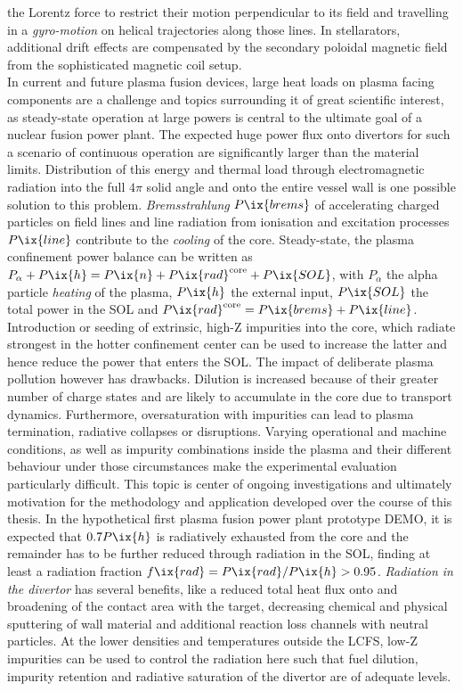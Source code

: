         the Lorentz force to restrict their motion perpendicular to its field and travelling in a \textit{gyro-motion} on helical trajectories along those lines. In stellarators, additional drift effects are compensated by the secondary poloidal magnetic field from the sophisticated magnetic coil setup\cite{Helander2014,Boozer2015}.\\%
        In current and future plasma fusion devices, large heat loads on plasma facing components are a challenge and topics surrounding it of great scientific interest, as steady-state operation at large powers is central to the ultimate goal of a nuclear fusion power plant. The expected huge power flux onto divertors for such a scenario of continuous operation are significantly larger than the material limits. Distribution of this energy and thermal load through electromagnetic radiation into the full $4\pi$ solid angle and onto the entire vessel wall is one possible solution to this problem. \textit{Bremsstrahlung} $P\ix{brems}$ of accelerating charged particles on field lines and line radiation from ionisation and excitation processes $P\ix{line}$ contribute to the \textit{cooling} of the core. Steady-state, the plasma confinement power balance can be written as $P_{\alpha}+P\ix{h}=P\ix{n}+P\ix{rad}^{\text{core}}+P\ix{SOL}$, with $P_{\alpha}$ the alpha particle \textit{heating} of the plasma, $P\ix{h}$ the external input, $P\ix{SOL}$ the total power in the SOL and $P\ix{rad}^{\text{core}}=P\ix{brems}+P\ix{line}$. Introduction or seeding of extrinsic, high-Z impurities into the core, which radiate strongest in the hotter confinement center can be used to increase the latter and hence reduce the power that enters the SOL\cite{Shubov2021,Schneider2006,Drawin1978}. The impact of deliberate plasma pollution however has drawbacks. Dilution is increased because of their greater number of charge states and are likely to accumulate in the core due to transport dynamics. Furthermore, oversaturation with impurities can lead to plasma termination, radiative collapses or disruptions. Varying operational and machine conditions, as well as impurity combinations inside the plasma and their different behaviour under those circumstances make the experimental evaluation particularly difficult\cite{Reimold2015}. This topic is center of ongoing investigations and ultimately motivation for the methodology and application developed over the course of this thesis. In the hypothetical first plasma fusion power plant prototype DEMO, it is expected that $0.7P\ix{h}$ is radiatively exhausted from the core and the remainder has to be further reduced through radiation in the SOL, finding at least a radiation fraction $f\ix{rad}=P\ix{rad}/P\ix{h}>0.95$. \textit{Radiation in the divertor} has several benefits, like a reduced total heat flux onto and broadening of the contact area with the target, decreasing chemical and physical sputtering of wall material and additional reaction loss channels with neutral particles. At the lower densities and temperatures outside the LCFS, low-Z impurities can be used to control the radiation here such that fuel dilution, impurity retention and radiative saturation of the divertor are of adequate levels\cite{Eich2013,Eich2011,Fuchert2020}.%
%
